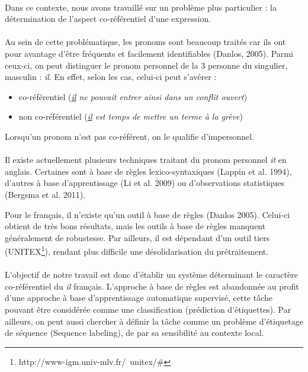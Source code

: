 \documentclass[a4paper,12pt]{article}
\begin{document}
\paragraph{}
Dans ce contexte, nous avons travaillé sur un problème plus particulier : la détermination de l'aspect co-référentiel d'une expression.

\paragraph{}
Au sein de cette problématique, les pronoms sont beaucoup traités car ils ont pour avantage d'être fréquents et facilement identifiables (Danlos\cite{danlos:ilimp:taln2005}, 2005). 
Parmi ceux-ci, on peut distinguer le pronom personnel de la 3 personne du singulier, masculin : \og{}\textit{il}\fg{}. 
En effet, selon les cas, celui-ci peut s'avérer : 
\begin{itemize}
 \item co-référentiel (\og{}\textit{\underline{il} ne pouvait entrer ainsi dans un conflit ouvert}\fg{})
 \item non co-référentiel (\og{}\textit{\underline{il} est temps de mettre un terme à la grève}\fg{})
\end{itemize}
Lorsqu'un pronom n'est pas co-référent, on le qualifie d'impersonnel.

\paragraph{}
Il existe actuellement plusieurs techniques traitant du pronom personnel \og{}\textit{it}\fg{} en anglais.
Certaines sont à base de règles lexico-syntaxiques (Lappin et al.\cite{Lappin:1994:APA:203987.203989} 1994), d'autres à base d'apprentissage (Li et al.\cite{Li:2009:IPU:1622716.1622726} 2009) ou d'observations statistiques (Bergsma et al.\cite{Bergsma:11} 2011).


Pour le français, il n'existe qu'un outil à base de règles (Danlos 2005). Celui-ci obtient de très bons résultats, mais les outils à base de règles manquent généralement de robustesse. Par ailleurs, il est dépendant d'un outil tiers (UNITEX\footnote{http://www-igm.univ-mlv.fr/~unitex/\#}), rendant plus difficile une désolidarisation du prétraitement. 

\paragraph{}
L'objectif de notre travail est donc d'établir un système déterminant le caractère co-référentiel du \og{}\textit{il}\fg{} français. L'approche à base de règles est abandonnée au profit d'une approche à base d'apprentissage automatique supervisé, cette tâche pouvant être considérée comme une classification (prédiction d'étiquettes). Par ailleurs, on peut aussi chercher à définir la tâche comme un problème d'étiquetage de séquence (Sequence labeling), de par sa sensibilité au contexte local.
\end{document}
